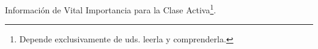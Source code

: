 \documentclass{beamer}
\begin{document}
\begin{frame}
\centering \Huge Información de Vital Importancia para la Clase Activa\footnote{Depende exclusivamente de uds. leerla y comprenderla.}.
\end{frame}
%
%
%
%
\end{document}
